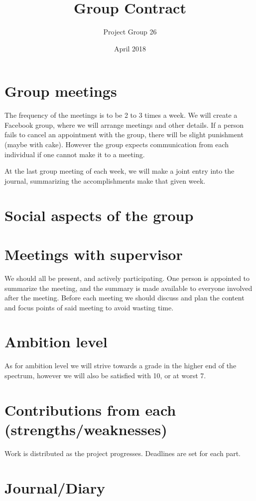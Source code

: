 \documentclass[11pt]{article}
\title{Group Contract}
\author{Project Group 26}
\date{April 2018}
\begin{document}
\maketitle

\section{Group meetings}

The frequency of the meetings is to be 2 to 3 times a week. We will create a Facebook group, where we will arrange meetings and other details. If a person fails to cancel an appointment with the group, there will be slight punishment (maybe with cake). However the group expects communication from each individual if one cannot make it to a meeting.

At the last group meeting of each week, we will make a joint entry into the journal, summarizing the accomplishments make that given week.


\section{Social aspects of the group}





\section{Meetings with supervisor}

We should all be present, and actively participating. One person is appointed to summarize the meeting, and the summary is made available to everyone involved after the meeting. Before each meeting we should discuss and plan the content and focus points of said meeting to avoid wasting time. 

\section{Ambition level}

As for ambition level we will strive towards a grade in the higher end of the spectrum, however we will also be satisfied with 10, or at worst 7.

\section{Contributions from each (strengths/weaknesses)}

Work is distributed as the project progresses. Deadlines are set for each part.

\section{Journal/Diary}
\end{document}
